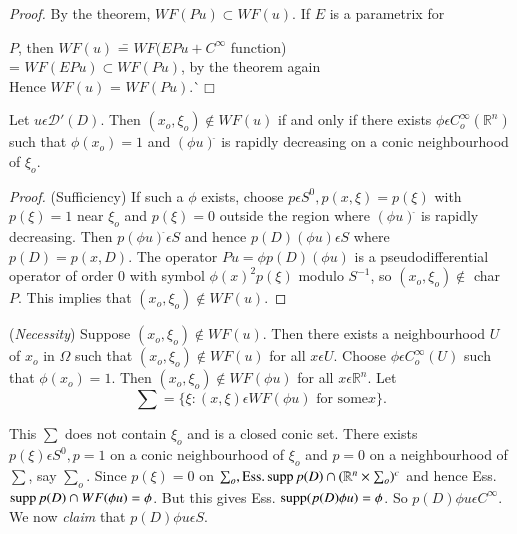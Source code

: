 \noindent \textit{Proof.}
  By the theorem, $WF(Pu) \subset WF(u)$. If $E$ is a parametrix for 
  \begin{tabbing}
    \quad $P$, then   $WF(u)$ \=  = $WF(EPu+ C^{\infty}$  function) \\
    \> = $WF(EPu) \subset WF(Pu)$, by the  theorem again ~\\
    Hence \quad $WF(u)$ \> = $WF(Pu)$.\`$\Box$
  \end{tabbing}

\setcounter{thm}{55}
\begin{thm}\label{chap4:sec9:thm4.56}%
  Let $u \epsilon \mathcal{D}' (D)$. Then $(x_o,  \xi_{o})
  \notin   WF(u)$ if and only if there exists $\phi \epsilon
  C^{\infty}_o (\mathbb{R}^n)$ such that $\phi (x_o) = 1$ and $(\phi
  u)^{\hat{}}$ is rapidly decreasing on a conic neighbourhood of
  $\xi_o$. 
\end{thm}

\begin{proof}
  (Sufficiency) If such a $\phi$ exists, choose $p \epsilon S^0,
  p(x, \xi) = p(\xi)$ with $p(\xi) =1$ near $\xi_o$ and $p(\xi) =0$
  outside the region where $(\phi u)^{\hat{}}$ is rapidly
  decreasing. Then $p(\phi u)^{\hat{}} \epsilon S$ and hence
  $p(D)(\phi u) \epsilon S$ where $p(D) = p(x,D)$. The operator $Pu =
  \phi p(D) (\phi u)$ is a pseudo\pageoriginale differential operator of order $0$
  with symbol $\phi (x)^2 p(\xi)$ modulo $S^{-1}$, so $(x_o,  \xi_{o})
  \notin $ char $P$. This implies that $(x_o,  \xi_{o}) \notin  WF(u)$.   
\end{proof}

(\textit{Necessity}) Suppose $(x_o,  \xi_{o}) \notin  WF(u)$. Then
there exists a neighbourhood $U$ of $x_o$ in $\Omega$ such that $(x_o, 
\xi_{o}) \notin  WF(u)$ for all $x \epsilon U$. Choose $ \phi
\epsilon C^{\infty}_o (U)$ such that $\phi (x_o) = 1$. Then $(x_o, 
\xi_{o}) \notin  WF( \phi u)$ for all $x \epsilon
\mathbb{R}^n$. Let  
$$
\sum = \{ \xi : (x,  \xi ) \epsilon  WF( \phi u) \text{ for some} x \}.
$$

This $\sum$ does not contain $\xi_o$ and is a closed conic set. There
exists $p(\xi) \epsilon S^0, p = 1$ on a conic neighbourhood of
$\xi_o$ and $p = 0$ on a neighbourhood of $\sum$, say $\sum_o$. Since
$p(\xi)= 0$ on $\sum_o, \text{Ess}. \operatorname{supp} p(D) \cap (\mathbb{R}^n \times
\sum_o)^c$ and hence Ess. $\operatorname{supp} p (D) \cap WF(\phi u ) =\phi$. But
this gives Ess. $\operatorname{supp}(p(D)\phi u) = \phi $. So $p(D) \phi u
\epsilon C^{\infty}$. We now \textit{ claim} that $p(D) \phi u
\epsilon S$. 

